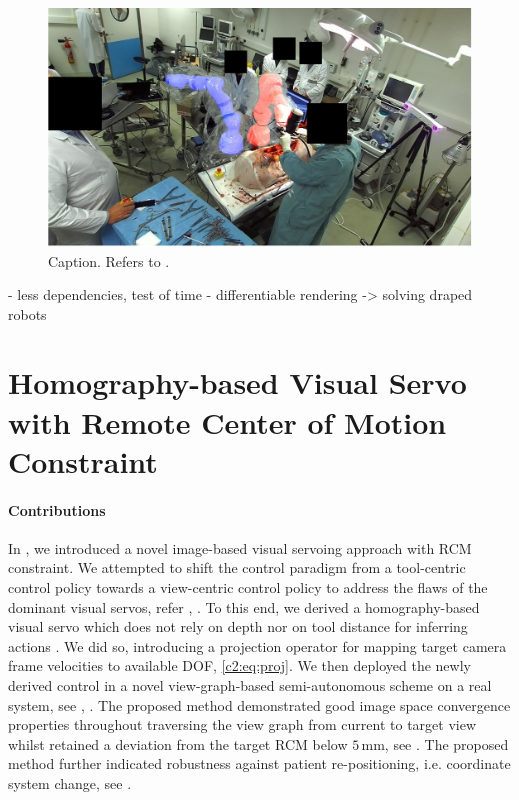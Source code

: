 \begin{figure}
    \centering
    \includegraphics[width=\textwidth]{conclusion/img/draped_ground_truth.pdf}
    \caption{Caption. Refers to .}
    \label{con:fig:draped_ground_truth}
\end{figure}
- less dependencies, test of time
- differentiable rendering -> solving draped robots

\section{Homography-based Visual Servo with Remote Center of Motion Constraint}
\label{con:sec:visual_servo}
\paragraph{Contributions} In , we introduced a novel image-based visual servoing approach with RCM constraint. We attempted to shift the control paradigm from a tool-centric control policy towards a view-centric control policy to address the flaws of the dominant visual servos, refer , . To this end, we derived a homography-based visual servo which does not rely on depth nor on tool distance for inferring actions . We did so, introducing a projection operator for mapping target camera frame velocities to available DOF, \eqref{c2:eq:proj}. We then deployed the newly derived control in a novel view-graph-based semi-autonomous scheme on a real system, see , . The proposed method demonstrated good image space convergence properties throughout traversing the view graph from current to target view whilst retained a deviation from the target RCM below $5\,\text{mm}$, see . The proposed method further indicated robustness against patient re-positioning, i.e. coordinate system change, see .

